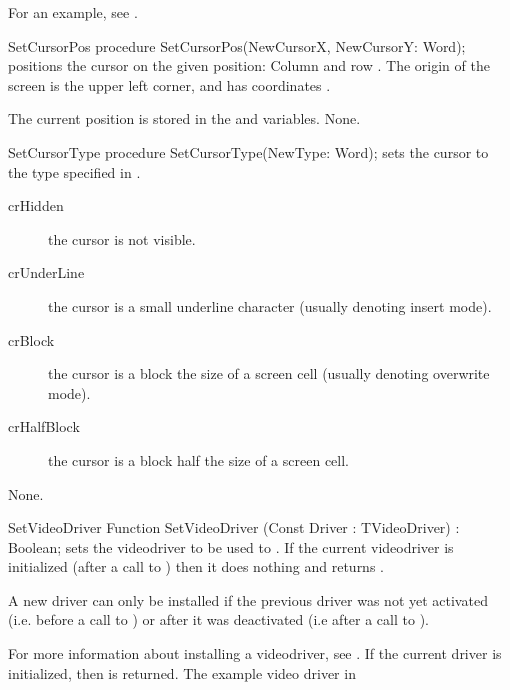 For an example, see .

\begin{procedure}{SetCursorPos}
\Declaration
procedure SetCursorPos(NewCursorX, NewCursorY: Word); 
\Description
{} positions the cursor on the given position: Column 
 and row . The origin of the screen is the
upper left corner, and has coordinates .

The current position is stored in the  and 
variables.
\Errors
None.
\SeeAlso
{}
\end{procedure}


\begin{procedure}{SetCursorType}
\Declaration
procedure SetCursorType(NewType: Word); 
\Description
{} sets the cursor to the type specified in .
\begin{description}
\item[crHidden] the cursor is not visible.
\item[crUnderLine] the cursor is a small underline character (usually 
denoting insert mode).
\item[crBlock] the cursor is a block the size of a screen cell (usually
denoting overwrite mode).
\item[crHalfBlock] the cursor is a block half the size of a screen cell.
\end{description}
\Errors
None.
\SeeAlso
{}
\end{procedure}

\begin{function}{SetVideoDriver}
\Declaration
Function SetVideoDriver (Const Driver : TVideoDriver) : Boolean;
\Description
{} sets the videodriver to be used to . If
the current videodriver is initialized (after a call to )
then it does nothing and returns .

A new driver can only be installed if the previous driver was not yet
activated (i.e. before a call to ) or after it was
deactivated (i.e after a call to ).

For more information about installing a videodriver, see .
\Errors
If the current driver is initialized, then  is returned.
\SeeAlso
The example video driver in 
\end{function}

